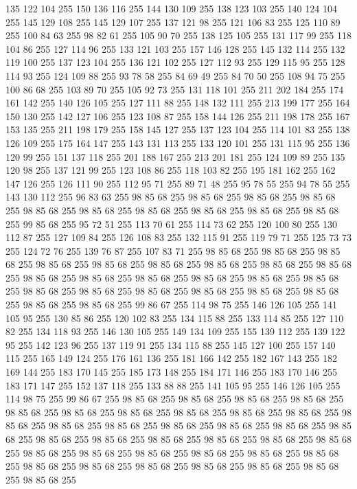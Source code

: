 135 122 104 255 150 136 116 255 144 130 109 255 138 123 103 255 140 124 104 255 145 129 108 255 145 129 107 255 137 121 98 255 121 106 83 255 125 110 89 255 100 84 63 255 98 82 61 255 105 90 70 255 138 125 105 255 131 117 99 255 118 104 86 255 127 114 96 255 133 121 103 255 157 146 128 255 145 132 114 255 132 119 100 255 137 123 104 255 136 121 102 255 127 112 93 255 129 115 95 255 128 114 93 255 124 109 88 255 93 78 58 255 84 69 49 255 84 70 50 255 108 94 75 255 100 86 68 255 103 89 70 255 105 92 73 255 131 118 101 255 211 202 184 255 174 161 142 255 140 126 105 255 127 111 88 255 148 132 111 255 213 199 177 255 164 150 130 255 142 127 106 255 123 108 87 255 158 144 126 255 211 198 178 255 167 153 135 255 211 198 179 255 158 145 127 255 137 123 104 255 114 101 83 255 138 126 109 255 175 164 147 255 143 131 113 255 133 120 101 255 131 115 95 255 136 120 99 255 151 137 118 255 201 188 167 255 213 201 181 255 124 109 89 255 135 120 98 255 137 121 99 255 123 108 86 255
118 103 82 255 195 181 162 255 162 147 126 255 126 111 90 255 112 95 71 255 89 71 48 255 95 78 55 255 94 78 55 255 143 130 112 255 96 83 63 255 98 85 68 255 98 85 68 255 98 85 68 255 98 85 68 255 98 85 68 255 98 85 68 255 98 85 68 255 98 85 68 255 98 85 68 255 98 85 68 255 99 85 68 255 95 72 51 255 113 70 61 255 114 73 62 255 120 100 80 255 130 112 87 255 127 109 84 255 126 108 83 255 132 115 91 255 119 79 71 255 125 73 73 255 124 72 76 255 139 76 87 255 107 83 71 255 98 85 68 255 98 85 68 255 98 85 68 255 98 85 68 255 98 85 68 255 98 85 68 255 98 85 68 255 98 85 68 255 98 85 68 255 98 85 68 255 98 85 68 255 98 85 68 255 98 85 68 255 98 85 68 255 98 85 68 255 98 85 68 255 98 85 68 255 98 85 68 255 98 85 68 255 98 85 68 255 98 85 68 255 98 85 68 255 98 85 68 255 99 86 67 255 114 98 75 255 146 126 105 255 141 105 95 255 130 85 86 255 120 102 83 255 134 115 88 255
133 114 85 255 127 110 82 255 134 118 93 255 146 130 105 255 149 134 109 255 155 139 112 255 139 122 95 255 142 123 96 255 137 119 91 255 134 115 88 255 145 127 100 255 157 140 115 255 165 149 124 255 176 161 136 255 181 166 142 255 182 167 143 255 182 169 144 255 183 170 145 255 185 173 148 255 184 171 146 255 183 170 146 255 183 171 147 255 152 137 118 255 133 88 88 255 141 105 95 255 146 126 105 255 114 98 75 255 99 86 67 255 98 85 68 255 98 85 68 255 98 85 68 255 98 85 68 255 98 85 68 255 98 85 68 255 98 85 68 255 98 85 68 255 98 85 68 255 98 85 68 255 98 85 68 255 98 85 68 255 98 85 68 255 98 85 68 255 98 85 68 255 98 85 68 255 98 85 68 255 98 85 68 255 98 85 68 255 98 85 68 255 98 85 68 255 98 85 68 255 98 85 68 255 98 85 68 255 98 85 68 255 98 85 68 255 98 85 68 255 98 85 68 255 98 85 68 255 98 85 68 255 98 85 68 255 98 85 68 255 98 85 68 255 98 85 68 255 98 85 68 255 98 85 68 255
